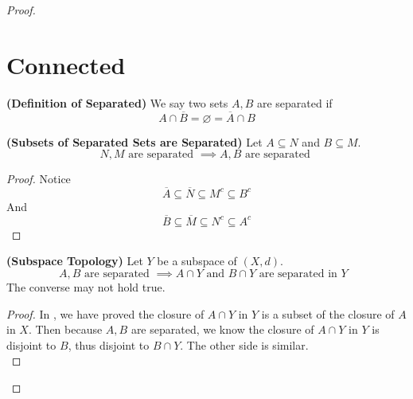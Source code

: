 \documentclass{report}
\begin{document}
\begin{proof}
\section{Connected}
\begin{definition}
\label{1.4.1}
\textbf{(Definition of Separated)} We say two sets $A,B$ are separated if 
 \begin{equation}
A\cap \overline{B}=\varnothing=\overline{A}\cap B
\end{equation}
\end{definition}
\begin{theorem}
\label{1.4.2}
\textbf{(Subsets of Separated Sets are Separated)} Let $A\subseteq N$ and $B\subseteq M$.  
\begin{equation}
N,M\text{ are separated }\implies A,B\text{ are separated }
\end{equation}
\end{theorem}
\begin{proof}
Notice
\begin{equation}
\overline{A}\subseteq \overline{N}\subseteq M^c\subseteq B^c
\end{equation}
And
\begin{equation}
\overline{B}\subseteq \overline{M} \subseteq N^c \subseteq A^c
\end{equation}
\end{proof}
\begin{theorem}
\label{1.4.3}
\textbf{(Subspace Topology)} Let $Y$ be a subspace of $(X,d)$.
\begin{equation}
A,B\text{ are separated }\implies A\cap Y\text{ and }B\cap Y\text{ are separated in $Y$ }
\end{equation}
The converse may not hold true.
\end{theorem}
\begin{proof}
In , we have proved the closure of $A\cap Y$ in $Y$ is a subset of the closure of  $A$ in $X$. Then because $A,B$ are separated, we know the closure of  $A\cap Y$ in $Y$ is disjoint to  $B$, thus disjoint to $B\cap Y$. The other side is similar.\\


\end{proof}
\end{proof}
\end{document}

